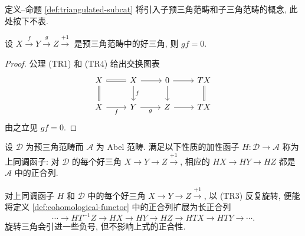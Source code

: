 定义--命题 \ref{def:triangulated-subcat} 将引入子预三角范畴和子三角范畴的概念, 此处按下不表.

\begin{lemma}\label{prop:dt-composite-null}
	设 $X \xrightarrow{f} Y \xrightarrow{g} Z \xrightarrow{+1}$ 是预三角范畴中的好三角, 则 $gf=0$.
\end{lemma}
\begin{proof}
	公理 (TR1) 和 (TR4) 给出交换图表
	\[\begin{tikzcd}
		X \arrow[equal, d] \arrow[equal, r] & X \arrow[r] \arrow[d, "f"] & 0 \arrow[d] \arrow[r] & TX \arrow[equal, d] \\
		X \arrow[r, "f"'] & Y \arrow[r, "g"'] & Z \arrow[r] & TX
	\end{tikzcd}\]
	由之立见 $gf=0$.
\end{proof}

\begin{definition}[上同调函子]\label{def:cohomological-functor}
	设 $\mathcal{D}$ 为预三角范畴而 $\mathcal{A}$ 为 Abel 范畴. 满足以下性质的加性函子 $H: \mathcal{D} \to \mathcal{A}$ 称为上同调函子: 对 $\mathcal{D}$ 的每个好三角 $X \to Y \to Z \xrightarrow{+1}$, 相应的 $HX \to HY \to HZ$ 都是 $\mathcal{A}$ 中的正合列.
\end{definition}

\begin{remark}[上同调函子的长正合列]\label{rem:cohomological-functor-long}
	对上同调函子 $H$ 和 $\mathcal{D}$ 中的每个好三角 $X \to Y \to Z \xrightarrow{+1}$, 以 (TR3) 反复旋转, 便能将定义 \ref{def:cohomological-functor} 中的正合列扩展为长正合列
	\[ \cdots \to HT^{-1}Z \to HX \to HY \to HZ \to HTX \to HTY \to \cdots . \]
	旋转三角会引进一些负号, 但不影响上式的正合性.
\end{remark}

